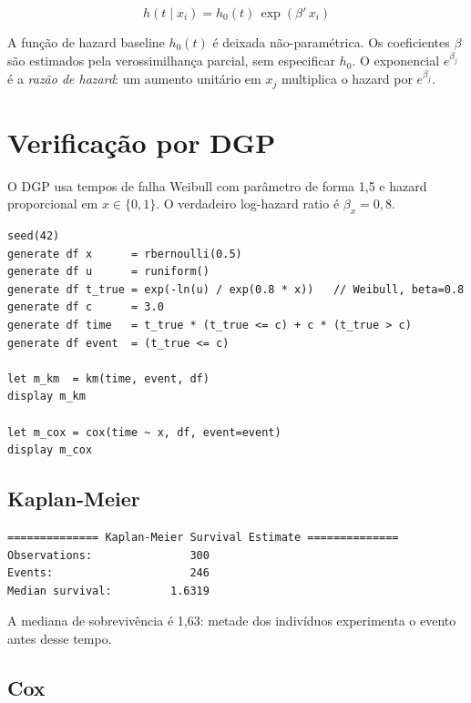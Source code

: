 \[
  h(t \mid x_i) = h_0(t)\,\exp(\beta'\,x_i)
\]

A função de hazard baseline $h_0(t)$ é deixada não-paramétrica. Os
coeficientes $\beta$ são estimados pela verossimilhança parcial, sem
especificar $h_0$. O exponencial $e^{\beta_j}$ é a \emph{razão de hazard}:
um aumento unitário em $x_j$ multiplica o hazard por $e^{\beta_j}$.

\section{Verificação por DGP}

O DGP usa tempos de falha Weibull com parâmetro de forma 1{,}5 e hazard
proporcional em $x \in \{0,1\}$. O verdadeiro log-hazard ratio é $\beta_x = 0{,}8$.

\begin{lstlisting}[caption={DGP de sobrevivência — Weibull com hazard proporcional}]
seed(42)
generate df x      = rbernoulli(0.5)
generate df u      = runiform()
generate df t_true = exp(-ln(u) / exp(0.8 * x))   // Weibull, beta=0.8
generate df c      = 3.0
generate df time   = t_true * (t_true <= c) + c * (t_true > c)
generate df event  = (t_true <= c)

let m_km  = km(time, event, df)
display m_km

let m_cox = cox(time ~ x, df, event=event)
display m_cox
\end{lstlisting}

\subsection*{Kaplan-Meier}

\begin{lstlisting}[language={}, basicstyle=\ttfamily\small,
  frame=none, numbers=none, backgroundcolor=\color{codbg},
  xleftmargin=0pt, xrightmargin=0pt, breaklines=false]
============== Kaplan-Meier Survival Estimate ==============
Observations:               300
Events:                     246
Median survival:         1.6319
\end{lstlisting}

A mediana de sobrevivência é 1{,}63: metade dos indivíduos experimenta o
evento antes desse tempo.

\subsection*{Cox}

